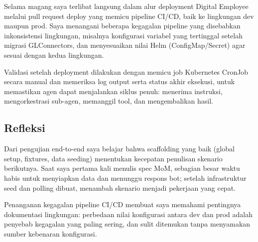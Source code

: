Selama magang saya terlibat langsung dalam alur deployment Digital Employee melalui pull request deploy yang memicu pipeline CI/CD, baik ke lingkungan dev maupun prod. Saya menangani beberapa kegagalan pipeline yang disebabkan inkonsistensi lingkungan, misalnya konfigurasi variabel yang tertinggal setelah migrasi GLConnectors, dan menyesuaikan nilai Helm (ConfigMap/Secret) agar sesuai dengan kedua lingkungan.

Validasi setelah deployment dilakukan dengan memicu job Kubernetes CronJob secara manual dan memeriksa log output serta status akhir eksekusi, untuk memastikan agen dapat menjalankan siklus penuh: menerima instruksi, mengorkestrasi sub-agen, memanggil tool, dan mengembalikan hasil.

\subsection{Refleksi}

Dari pengujian end-to-end saya belajar bahwa scaffolding yang baik (global setup, fixtures, data seeding) menentukan kecepatan penulisan skenario berikutnya. Saat saya pertama kali menulis spec MoM, sebagian besar waktu habis untuk menyiapkan data dan menunggu respons bot; setelah infrastruktur seed dan polling dibuat, menambah skenario menjadi pekerjaan yang cepat.

Penanganan kegagalan pipeline CI/CD membuat saya memahami pentingnya dokumentasi lingkungan: perbedaan nilai konfigurasi antara dev dan prod adalah penyebab kegagalan yang paling sering, dan sulit ditemukan tanpa menyamakan sumber kebenaran konfigurasi.

\clearpage
